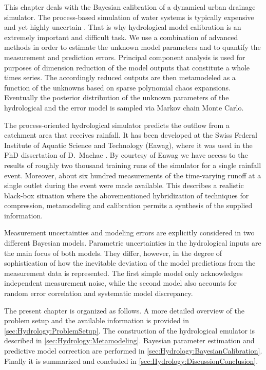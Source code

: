 This chapter deals with the Bayesian calibration of a dynamical urban drainage simulator.
The process-based simulation of water systems is typically expensive and yet highly uncertain \cite{Physics:Beven2012}.
That is why hydrological model calibration is an extremely important and difficult task.
We use a combination of advanced methods in order to estimate the unknown model parameters and to quantify the measurement and prediction errors.
Principal component analysis is used for purposes of dimension reduction of the model outputs that constitute a whole times series.
The accordingly reduced outputs are then metamodeled as a function of the unknowns based on sparse polynomial chaos expansions.
Eventually the posterior distribution of the unknown parameters of the hydrological and the error model is sampled via Markov chain Monte Carlo.
\par %
The process-oriented hydrological simulator predicts the outflow from a catchment area that receives rainfall.
It has been developed at the Swiss Federal Institute of Aquatic Science and Technology (Eawag), where it was used in the PhD dissertation of D.\ Machac \cite{Hydro:Machac2015:PhD}.
By courtesy of Eawag we have access to the results of roughly two thousand training runs of the simulator for a single rainfall event.
Moreover, about six hundred measurements of the time-varying runoff at a single outlet during the event were made available.
This describes a realistic black-box situation where the abovementioned hybridization of techniques for compression, metamodeling and calibration permits a synthesis of the supplied information.
\par %
Measurement uncertainties and modeling errors are explicitly considered in two different Bayesian models.
Parametric uncertainties in the hydrological inputs are the main focus of both models.
They differ, however, in the degree of sophistication of how the inevitable deviation of the model predictions from the measurement data is represented.
The first simple model only acknowledges independent measurement noise, while the second model also accounts for random error correlation and systematic model discrepancy.
\par %
The present chapter is organized as follows.
A more detailed overview of the problem setup and the available information is provided in \cref{sec:Hydrology:ProblemSetup}.
The construction of the hydrological emulator is described in \cref{sec:Hydrology:Metamodeling}.
Bayesian parameter estimation and predictive model correction are performed in \cref{sec:Hydrology:BayesianCalibration}.
Finally it is summarized and concluded in \cref{sec:Hydrology:DiscussionConclusion}.